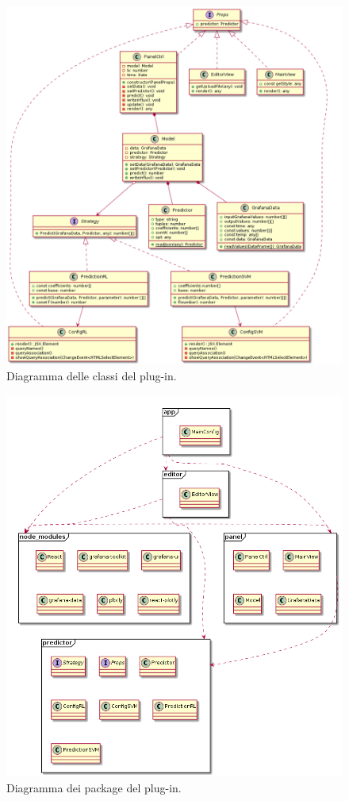 \documentclass[../manuale-sviluppatore.tex]{subfiles}
\begin{document}
\begin{figure}[H]
  \centering
  \includegraphics[width=15cm]{img/plugin/GrafanaClasses.png}
  \caption{Diagramma delle classi del plug-in.}
\end{figure}

\begin{figure}[H]
  \centering
  \includegraphics[width=15cm]{img/plugin/packagesDiagramPlug.png}
  \caption{Diagramma dei package del plug-in.}
\end{figure}
\end{document}
